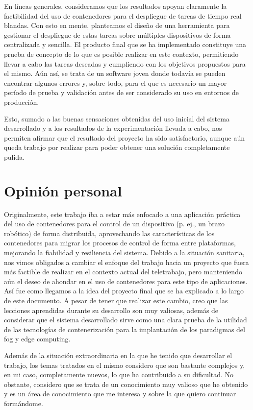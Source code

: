 En líneas generales, consideramos que los resultados apoyan claramente la
factibilidad del uso de contenedores para el despliegue de tareas de tiempo real
blandas. Con esto en mente, planteamos el diseño de una herramienta para
gestionar el despliegue de estas tareas sobre múltiples dispositivos de forma
centralizada y sencilla. El producto final que se ha implementado constituye una
prueba de concepto de lo que es posible realizar en este contexto, permitiendo
llevar a cabo las tareas deseadas y cumpliendo con los objetivos propuestos para
el mismo. Aún así, se trata de un software joven donde todavía se pueden
encontrar algunos errores y, sobre todo, para el que es necesario un mayor
período de prueba y validación antes de ser considerado su uso en entornos de
producción.

Esto, sumado a las buenas sensaciones obtenidas del uso inicial del sistema
desarrollado y a los resultados de la experimentación llevada a cabo, nos
permiten afirmar que el resultado del proyecto ha sido satisfactorio, aunque aún
queda trabajo por realizar para poder obtener una solución completamente pulida.

\section{Opinión personal}

Originalmente, este trabajo iba a estar más enfocado a una aplicación práctica
del uso de contenedores para el control de un dispositivo (p. ej., un brazo
robótico) de forma distribuida, aprovechando las características de los
contenedores para migrar los procesos de control de forma entre plataformas,
mejorando la fiabilidad y resiliencia del sistema. Debido a la situación
sanitaria, nos vimos obligados a cambiar el enfoque del trabajo hacia un
proyecto que fuera más factible de realizar en el contexto actual del
teletrabajo, pero manteniendo aún el deseo de ahondar en el uso de contenedores
para este tipo de aplicaciones. Así fue como llegamos a la idea del proyecto
final que se ha explicado a lo largo de este documento. A pesar de tener que
realizar este cambio, creo que las lecciones aprendidas durante su desarrollo
son muy valiosas, además de considerar que el sistema desarrollado sirve como
una clara prueba de la utilidad de las tecnologías de contenerización para la
implantación de los paradigmas del fog y edge computing.

Además de la situación extraordinaria en la que he tenido que desarrollar el
trabajo, los temas tratados en el mismo considero que son bastante complejos y,
en mi caso, completamente nuevos, lo que ha contribuido a su dificultad. No
obstante, considero que se trata de un conocimiento muy valioso que he obtenido
y es un área de conocimiento que me interesa y sobre la que quiero continuar
formándome.

